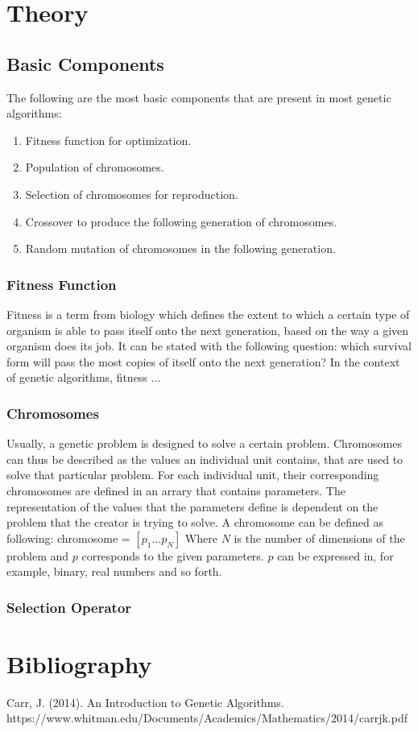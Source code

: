 \documentclass{article}
\begin{document}
\section{Theory}
\subsection{Basic Components}
The following are the most basic components that are present in most genetic algorithms:
\begin{enumerate}
    \item Fitness function for optimization.
    \item Population of chromosomes.
    \item Selection of chromosomes for reproduction.
    \item Crossover to produce the following generation of chromosomes.
    \item Random mutation of chromosomes in the following generation.
\end{enumerate}
\medbreak
\subsubsection{Fitness Function}
Fitness is a term from biology which defines the extent to which a certain type of organism is able to pass itself onto the next generation, based on the way a given organism does its job. It can be stated with the following question: which survival form will pass the most copies of itself onto the next generation?\smallbreak
In the context of genetic algorithms, fitness ...

\subsubsection{Chromosomes}
Usually, a genetic problem is designed to solve a certain problem. Chromosomes can thus be described as the values an individual unit contains, that are used to solve that particular problem. For each individual unit, their corresponding chromosomes are defined in an arrary that contains parameters. The representation of the values that the parameters define is dependent on the problem that the creator is trying to solve. A chromosome can be defined as following:\smallbreak
chromosome = $\left[ p_{1} ... p_{N} \right]$\smallbreak
Where $N$ is the number of dimensions of the problem and $p$ corresponds to the given parameters. $p$ can be expressed in, for example, binary, real numbers and so forth.
\bigbreak
\subsubsection{Selection Operator}

\bigbreak

\newpage
\section{Bibliography}
Carr, J. (2014). An Introduction to Genetic Algorithms.\smallbreak
https://www.whitman.edu/Documents/Academics/Mathematics/2014/carrjk.pdf

‌
\end{document}
